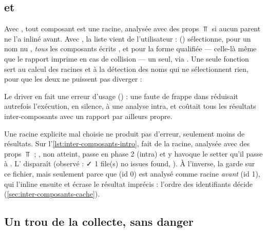 \subsection{ et }

Avec , tout composant est une racine, analysée avec des props $\Top$ si
aucun parent ne l'a inliné avant. Avec , la liste vient de l'utilisateur :
 () sélectionne, pour un nom nu
, \emph{tous} les composants écrits , et pour la forme qualifiée
 --- celle-là même que le rapport imprime en cas de collision --- un
seul, via . Une seule fonction sert au calcul des racines et à la
détection des noms qui ne sélectionnent rien, pour que les deux ne puissent pas diverger :


Le driver en fait une erreur d'usage () : une faute de frappe
dans  réduisait autrefois l'exécution, en silence, à une analyse intra, et
coûtait tous les résultats inter-composants avec un rapport par ailleurs propre.


\begin{piege}
Une racine explicite mal choisie ne produit pas d'erreur, seulement moins de résultats. Sur
l'\cref{lst:inter-composants-intro},  fait de  la racine,
analysée avec des props $\Top$ ; , non atteint, passe en phase 2 (intra) et y
havoque le setter qu'il passe à . L'\Error{} disparaît (observé :
\og ✓ 1 file(s) no issues found\fg{}, ). À l'inverse,
 la garde sur ce fichier, mais seulement parce que  (id 0) est
analysé comme racine \emph{avant}  (id 1), qui l'inline ensuite et écrase le
résultat imprécis : l'ordre des identifiants décide (\cref{sec:inter-composants-cache}).
\end{piege}

\subsection{Un trou de la collecte, sans danger}

